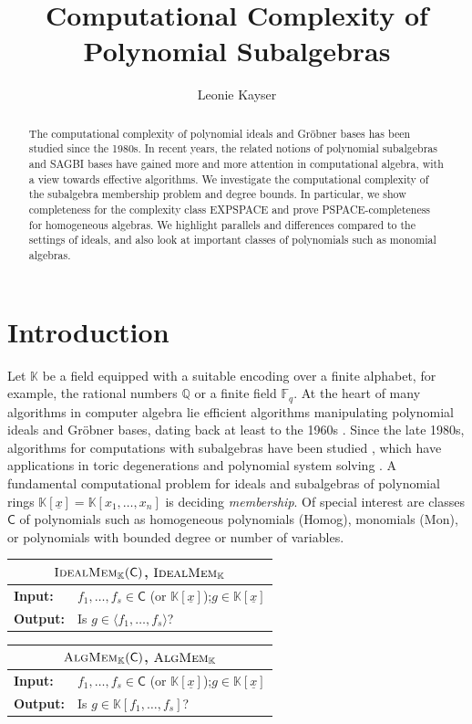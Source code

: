 \documentclass[12pt]{article}
\title{Computational Complexity of Polynomial Subalgebras}
\author{Leonie Kayser}
\date{}
\newcommand{\QQ}{\mathbb{Q}}
\newcommand{\KK}{\mathbb{K}}
\newcommand{\FF}{\mathbb{F}}
\newcommand\problemBox[4][0.96\textwidth]{
\begin{tabularx}{#1}{lX}
\toprule
\multicolumn{2}{c}{#2} \\ \midrule
\textbf{Input:}    & #3  \\
\textbf{Output:} & #4  \\ \bottomrule
\end{tabularx}
}
\newcommand{\pclass}[1]{\textsf{\textup{#1}}}
\newcommand{\Mon}{\pclass{Mon}}
\newcommand{\Homog}{\pclass{Homog}}
\newcommand{\x}{{\underline x}}
\newcommand{\problemText}[1]{\textsc{#1}\xspace}
\newcommand{\IdealMem}{\problemText{IdealMem}}
\newcommand{\AlgMem}{\problemText{AlgMem}}
\newcommand{\cclass}[1]{\textsf{\textup{#1}}\xspace}
\newcommand{\PSPACE}{\cclass{PSPACE}}
\newcommand{\EXPSPACE}{\cclass{EXPSPACE}}
\begin{document}
\maketitle

\begin{abstract}
The computational complexity of polynomial ideals and Gröbner bases has been studied since the 1980s. In recent years, the related notions of polynomial subalgebras and SAGBI bases have gained more and more attention in computational algebra, with a view towards effective algorithms. We investigate the computational complexity of the subalgebra membership problem and degree bounds. In particular, we show completeness for the complexity class \EXPSPACE and prove \PSPACE-completeness for homogeneous algebras. We highlight parallels and differences compared to the settings of ideals, and also look at important classes of polynomials such as monomial algebras.
\end{abstract}


\section{Introduction}

Let $\KK$ be a field equipped with a suitable encoding over a finite alphabet, for example, the rational numbers $\QQ$ or a finite field $\FF_q$.
At the heart of many algorithms in computer algebra lie efficient algorithms manipulating polynomial ideals and Gröbner bases, dating back at least to the 1960s \cite{Buchberger2006}. Since the late 1980s, algorithms for computations with subalgebras have been studied \cite{Shannon1988, Robbiano1990}, which have applications in toric degenerations and polynomial system solving \cite{betti2025}. A fundamental computational problem for ideals and subalgebras of polynomial rings $\KK[\x] = \KK[x_1,\dots,x_n]$ is deciding \emph{membership}. Of special interest are classes $\textsf{C}$ of polynomials such as homogeneous polynomials (\Homog), monomials (\Mon), or polynomials with bounded degree or number of variables.

\begin{table}[H]
\centering
\problemBox[0.48\textwidth]{$\IdealMem_\KK(\textsf{C})$, $\IdealMem_\KK$}
{$f_1,\dots,f_s \in \textsf{C}$ (or $\KK[\x]$);\newline $g \in \KK[\x]$}
{Is $g \in \langle f_1,\dots,f_s \rangle$?}
\problemBox[0.48\textwidth]{$\AlgMem_\KK(\textsf{C})$, $\AlgMem_\KK$}
{$f_1,\dots,f_s \in \textsf{C}$ (or $\KK[\x]$);\newline $g \in \KK[\x]$}
{Is $g \in \KK[f_1,\dots,f_s]$?}
\end{table}
\end{document}

